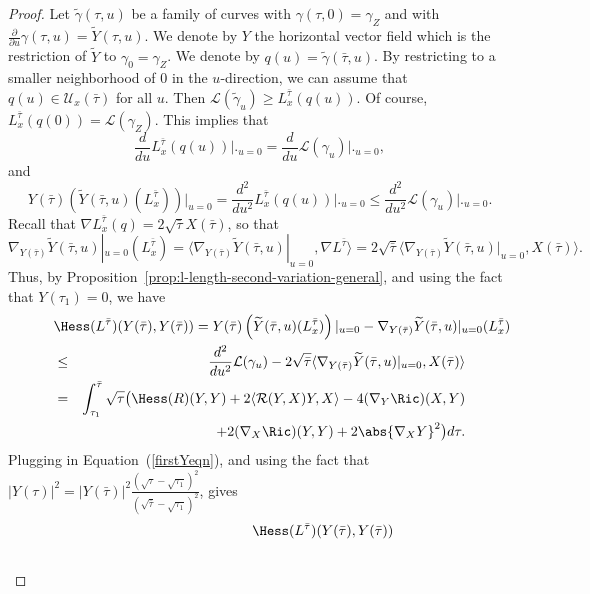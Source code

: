 \begin{proof}
Let $\tilde\gamma(\tau,u)$ be a family  of curves with
$\gamma(\tau,0)=\gamma_Z$ and with $\frac{\partial}{\partial
u}\gamma(\tau,u)=\widetilde Y(\tau,u)$. We denote by $Y$ the
horizontal vector field which is the restriction of $\widetilde Y$
to $\gamma_0=\gamma_Z$. We denote by
$q(u)=\tilde\gamma(\bar\tau,u)$. By restricting to a smaller
neighborhood of $0$ in the $u$-direction, we can assume that
$q(u)\in {\mathcal U}_x(\bar\tau)$ for all $u$. Then ${\mathcal
L}(\tilde\gamma_u)\ge L_x^{\bar\tau}(q(u))$. Of course,
$L_x^{\bar\tau}(q(0))={\mathcal L}(\gamma_Z)$. This implies that
$$\frac{d}{d u}L_x^{\bar\tau}(q(u))\bigl|\bigr._{u=0}=
\frac{d}{du}{\mathcal L}(\gamma_u)\bigl|\bigr._{u=0},$$
 and
$$
Y(\bar\tau)(\widetilde
Y(\bar\tau,u)(L^{\bar\tau}_x))|_{u=0}=\frac{d^2}{du^2}L_x^{\bar\tau}(q(u))\bigl|\bigr._{u=0}\le
\frac{d^2}{du^2}{\mathcal L}(\gamma_u)\bigl|\bigr._{u=0}.$$
 Recall that
$\nabla L_x^{\bar\tau}(q) = 2\sqrt{\bar\tau}X(\bar\tau)$, so that
$$\nabla_{Y(\bar\tau)}\widetilde Y(\bar\tau,u)|_{u=0}(L_x^{\bar\tau})=
\langle \nabla_{Y(\bar\tau)}\widetilde Y(\bar\tau,u)|_{u=0},\nabla
L^{\bar\tau}\rangle = 2\sqrt{\bar\tau}\langle
\nabla_{Y(\bar\tau)}\widetilde
Y(\bar\tau,u)|_{u=0},X(\bar\tau)\rangle .$$ Thus, by
Proposition~\ref{prop:l-length-second-variation-general}, and using the fact that
$Y(\tau_1)=0$, we have
\begin{eqnarray*}
\lefteqn{\Hess(L^{\bar\tau})(Y(\bar\tau),Y(\bar\tau))  =
Y(\bar\tau)\left(\widetilde
Y(\bar\tau,u)(L_x^{\bar\tau})\right)|_{u=0}-
\nabla_{Y(\bar\tau)}\widetilde Y(\bar\tau,u)|_{u=0}(L_x^{\bar\tau})} \\
& \le & \frac{d^2}{du^2}{\mathcal
L}(\gamma_u)-2\sqrt{\bar\tau}\langle
\nabla_{Y(\bar\tau)}\widetilde Y(\bar\tau,u)|_{u=0},X(\bar\tau)\rangle \\
 & = & \int_{\tau_1}^{\bar\tau}
\sqrt{\tau}\bigl(\Hess(R)(Y,Y) +
2\langle {\mathcal R}(Y,X)Y,X\rangle - 4(\nabla_{Y}\Ric)(X,Y)\bigr. \\
& & \ \ \ \ \bigl.+ 2(\nabla_{X}\Ric)(Y,Y) +
2\abs{\nabla_XY}^2\bigr)d\tau.
\end{eqnarray*}
 Plugging in Equation~(\ref{firstYeqn}), and using the fact that
 $|Y(\tau)|^2=
|Y(\bar\tau)|^2\frac{(\sqrt{\tau}-\sqrt{\tau_1})^2}{(\sqrt{\bar\tau}-\sqrt{\tau_1})^2}$,
gives
\begin{eqnarray*}
\lefteqn{\Hess(L^{\bar\tau})(Y(\bar\tau),Y(\bar\tau)) } \\ &

\end{eqnarray*}
\end{proof}

